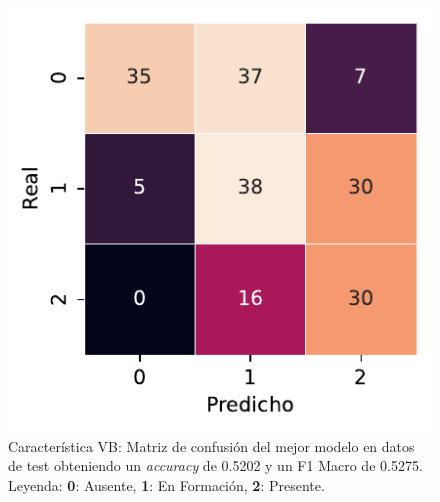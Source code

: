 \begin{figure}[htbp]
    \vspace{1.5em} %

    \includegraphics[width=0.6\linewidth]{figures/5_experiments/single-vb-cm.pdf}
    \caption[Característica VB: Matriz de confusión del mejor modelo en datos de test.]{Característica VB: Matriz de confusión del mejor modelo en datos de test obteniendo un \textit{accuracy} de 0.5202 y un F1 Macro de 0.5275. Leyenda: \textbf{0}: Ausente, \textbf{1}: En Formación, \textbf{2}: Presente.}
    \label{fig5:VB_confusion_matrix}
\end{figure}

